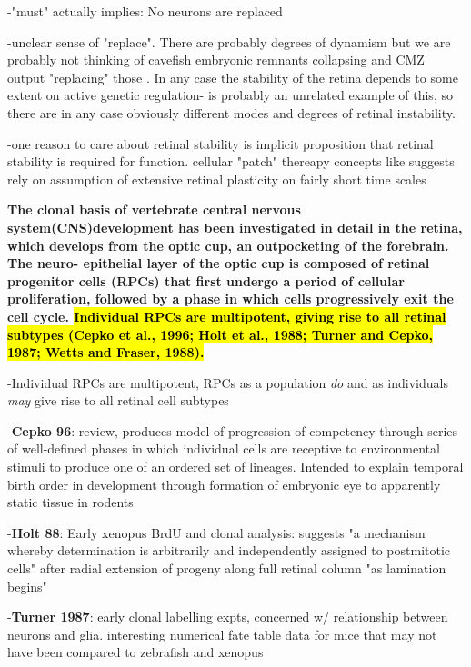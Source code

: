 \documentclass{ut-thesis}
\begin{document}
\bigskip

-"must" actually implies: No neurons are replaced

-unclear sense of "replace". There are probably degrees of dynamism but we are probably not thinking of cavefish embryonic remnants collapsing and CMZ output "replacing" those \cite{Strickler2002}. In any case the stability of the retina depends to some extent on active genetic regulation- \cite{Horsford2004} is probably an unrelated example of this, so there are in any case obviously different modes and degrees of retinal instability.

-one reason to care about retinal stability is implicit proposition that retinal stability is required for function. cellular "patch" thereapy concepts like \cite{Nakano2012} suggests rely on assumption of extensive retinal plasticity on fairly short time scales

\bigskip
	\textbf{
The clonal basis of vertebrate central nervous system(CNS)development 
has been investigated in detail in the retina, which develops
from the optic cup, an outpocketing of the forebrain. The neuro-
epithelial layer of the optic cup is composed of retinal progenitor
cells (RPCs) that first undergo a period of cellular proliferation,
followed by a phase in which cells progressively exit the cell
cycle. \hl{Individual RPCs are multipotent, giving rise to all retinal
subtypes (Cepko et al., 1996; Holt et al., 1988; Turner and
Cepko, 1987; Wetts and Fraser, 1988).}}

\bigskip

-Individual RPCs are multipotent, RPCs as a population \textit{do} and as individuals \textit{may} give rise to all retinal cell subtypes

-\textbf{Cepko 96\cite{Cepko1996}}: review, produces model of progression of competency through series of well-defined phases in which individual cells are receptive to environmental stimuli to produce one of an ordered set of lineages. Intended to explain temporal birth order in development through formation of embryonic eye to apparently static tissue in rodents

-\textbf{Holt 88\cite{Holt1988}}: Early xenopus BrdU and clonal analysis: suggests "a mechanism whereby determination is arbitrarily and independently assigned to postmitotic cells" after radial extension of progeny along full retinal column "as lamination begins"

-\textbf{Turner 1987\cite{Turner1987}}: early clonal labelling expts, concerned w/ relationship between neurons and glia. interesting numerical fate table data for mice that may not have been compared to zebrafish and xenopus \cite{Thuret2015}
\end{document}
